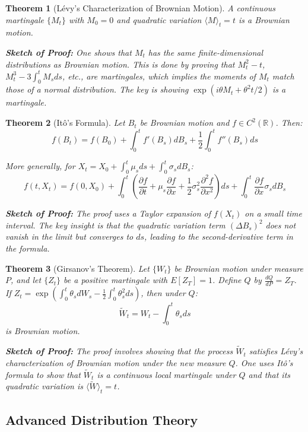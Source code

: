 \documentclass[12pt,a4paper]{article}
\newtheorem{theorem}{Theorem}[section]
\theoremstyle{remark}
\begin{document}
\begin{theorem}[Lévy's Characterization of Brownian Motion]
A continuous martingale $\{M_t\}$ with $M_0 = 0$ and quadratic variation $\langle M \rangle_t = t$ is a Brownian motion.

\textbf{Sketch of Proof:} One shows that $M_t$ has the same finite-dimensional distributions as Brownian motion. This is done by proving that $M_t^2-t$, $M_t^3 - 3\int_0^t M_s ds$, etc., are martingales, which implies the moments of $M_t$ match those of a normal distribution. The key is showing $\exp(i\theta M_t + \theta^2 t/2)$ is a martingale.
\end{theorem}

\begin{theorem}[Itô's Formula]
Let $B_t$ be Brownian motion and $f \in C^2(\mathbb{R})$. Then:
$$f(B_t) = f(B_0) + \int_0^t f'(B_s) dB_s + \frac{1}{2} \int_0^t f''(B_s) ds$$

More generally, for $X_t = X_0 + \int_0^t \mu_s ds + \int_0^t \sigma_s dB_s$:
$$f(t, X_t) = f(0, X_0) + \int_0^t \left(\frac{\partial f}{\partial t} + \mu_s \frac{\partial f}{\partial x} + \frac{1}{2}\sigma_s^2 \frac{\partial^2 f}{\partial x^2}\right) ds + \int_0^t \frac{\partial f}{\partial x} \sigma_s dB_s$$

\textbf{Sketch of Proof:} The proof uses a Taylor expansion of $f(X_t)$ on a small time interval. The key insight is that the quadratic variation term $(\Delta B_s)^2$ does not vanish in the limit but converges to $ds$, leading to the second-derivative term in the formula.
\end{theorem}

\begin{theorem}[Girsanov's Theorem]
Let $\{W_t\}$ be Brownian motion under measure $P$, and let $\{Z_t\}$ be a positive martingale with $E[Z_T] = 1$. Define $Q$ by $\frac{dQ}{dP} = Z_T$. If $Z_t = \exp\left(\int_0^t \theta_s dW_s - \frac{1}{2}\int_0^t \theta_s^2 ds\right)$, then under $Q$:
$$\tilde{W}_t = W_t - \int_0^t \theta_s ds$$
is Brownian motion.

\textbf{Sketch of Proof:} The proof involves showing that the process $\tilde{W}_t$ satisfies Lévy's characterization of Brownian motion under the new measure $Q$. One uses Itô's formula to show that $\tilde{W}_t$ is a continuous local martingale under $Q$ and that its quadratic variation is $\langle \tilde{W} \rangle_t = t$.
\end{theorem}

\subsection{Advanced Distribution Theory}
\end{document}
